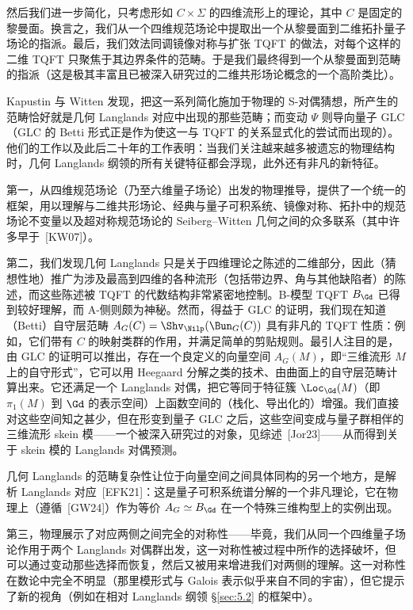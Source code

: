 然后我们进一步简化，只考虑形如 $C\times\Sigma$ 的四维流形上的理论，其中 $C$ 是固定的黎曼面。换言之，我们从一个四维规范场论中提取出一个从黎曼面到二维拓扑量子场论的指派。最后，我们效法同调镜像对称与扩张 TQFT 的做法，对每个这样的二维 TQFT 只聚焦于其边界条件的范畴。于是我们最终得到一个从黎曼面到范畴的指派（这是极其丰富且已被深入研究过的二维共形场论概念的一个高阶类比）。

Kapustin 与 Witten 发现，把这一系列简化施加于物理的 S-对偶猜想，所产生的范畴恰好就是几何 Langlands 对应中出现的那些范畴；而变动 $\Psi$ 则导向量子 GLC（GLC 的 Betti 形式正是作为使这一与 TQFT 的关系显式化的尝试而出现的）。他们的工作以及此后二十年的工作表明：当我们关注越来越多被遗忘的物理结构时，几何 Langlands 纲领的所有关键特征都会浮现，此外还有非凡的新特征。

第一，从四维规范场论（乃至六维量子场论）出发的物理推导，提供了一个统一的框架，用以理解与二维共形场论、经典与量子可积系统、镜像对称、拓扑中的规范场论不变量以及超对称规范场论的 Seiberg–Witten 几何之间的众多联系（其中许多早于~[KW07]）。

第二，我们发现几何 Langlands 只是关于四维理论之陈述的二维部分，因此（猜想性地）推广为涉及最高到四维的各种流形（包括带边界、角与其他缺陷者）的陈述，而这些陈述被 TQFT 的代数结构非常紧密地控制。B-模型 TQFT $B_{\Gd}$ 已得到较好理解，而 A-侧则颇为神秘。然而，得益于 GLC 的证明，我们现在知道（Betti）自守层范畴 $A_{G}(C)=\Shv_{\Nilp}(\Bun_{G}(C))$ 具有非凡的 TQFT 性质：例如，它们带有 $C$ 的映射类群的作用，并满足简单的剪贴规则。最引人注目的是，由 GLC 的证明可以推出，存在一个良定义的向量空间 $A_{G}(M)$，即“三维流形 $M$ 上的自守形式”，它可以用 Heegaard 分解之类的技术、由曲面上的自守层范畴计算出来。它还满足一个 Langlands 对偶，把它等同于特征簇 $\Loc_{\Gd}(M)$（即 $\pi_{1}(M)$ 到 $\Gd$ 的表示空间）上函数空间的（栈化、导出化的）增强。我们直接对这些空间知之甚少，但在形变到量子 GLC 之后，这些空间变成与量子群相伴的三维流形 skein 模——一个被深入研究过的对象，见综述~[Jor23]——从而得到关于 skein 模的 Langlands 对偶预测。

几何 Langlands 的范畴复杂性让位于向量空间之间具体同构的另一个地方，是解析 Langlands 对应~[EFK21]：这是量子可积系统谱分解的一个非凡理论，它在物理上（遵循~[GW24]）作为等价 $A_{G}\simeq B_{\Gd}$ 在一个特殊三维构型上的实例出现。

第三，物理展示了对应两侧之间完全的对称性——毕竟，我们从同一个四维量子场论作用于两个 Langlands 对偶群出发，这一对称性被过程中所作的选择破坏，但可以通过变动那些选择而恢复，然后又被用来增进我们对两侧的理解。这一对称性在数论中完全不明显（那里模形式与 Galois 表示似乎来自不同的宇宙），但它提示了新的视角（例如在相对 Langlands 纲领 \S\ref{sec:5.2} 的框架中）。

